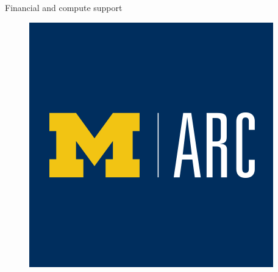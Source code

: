 \documentclass[]{beamer}
\begin{document}
\begin{frame}{Financial and compute support}
\begin{minipage}{0.23\linewidth}
\begin{figure}
			\includegraphics[width=0.99\linewidth,trim={0em 3cm 0em 3cm},clip]{back_matter/arc.png}
		\end{figure}
	\end{minipage}
\end{frame}

	
\end{document}
